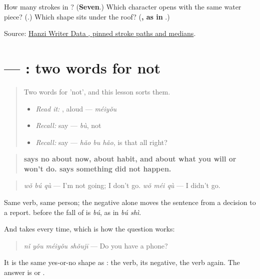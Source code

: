 \begin{tcolorbox}[breakable,colback=teal!4,colframe=teal!35!black,title={Before you move on}]
How many strokes in ? (\textbf{Seven}.) Which character opens with the same water piece? (\textbf{}.) Which shape sits under the roof? (\textbf{, as in }.)

Source: \href{https://raw.githubusercontent.com/chanind/hanzi-writer-data/68d10a4b21150cae5e1ebbd223eed289cf32d90c/data/\%E6\%B2\%A1.json}{Hanzi Writer Data , pinned stroke paths and medians}.
\end{tcolorbox}
\section[\texorpdfstring{\zh{不} — \zh{没} (bù — méi)}{不 — 没 (bù — méi)}]{ — : two words for not}

\label{lesson:ZH-C87-bu-mei}



\begin{quote}
Two words for 'not', and this lesson sorts them.

\begin{itemize}
\raggedright
  \item \emph{Read it:} , aloud — \emph{méiyǒu}
  \item \emph{Recall:} say  — \emph{bù}, not
  \item \emph{Recall:} say  — \emph{hǎo bu hǎo}, is that all right?
\end{itemize}
\end{quote}

\begin{grammarlens}[title={Grammar Lens: \zh{不} for now and for habit, \zh{没} for what did not happen}]
\begin{quote}
\textbf{ says no about now, about habit, and about what you will or won't do.  says something did not happen.}
\end{quote}

\begin{quote}
\textbf{} \emph{wǒ bú qù} — I'm not going; I don't go. \textbf{} \emph{wǒ méi qù} — I didn't go.
\end{quote}

Same verb, same person; the negative alone moves the sentence from a decision to a report.  before the fall of  is \emph{bú}, as in \emph{bú shì}.

And  takes  every time, which is how the question works:

\begin{quote}
\textbf{} \emph{nǐ yǒu méiyǒu shǒujī} — Do you have a phone?
\end{quote}

It is the same yes-or-no shape as : the verb, its negative, the verb again. The answer is  or .
\end{grammarlens}


